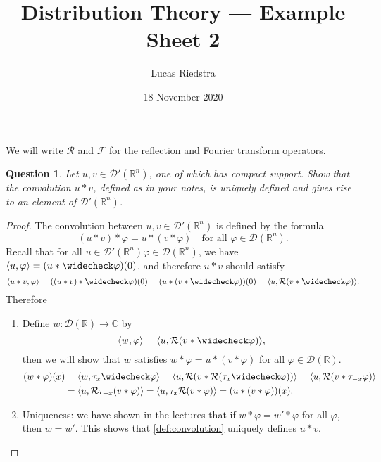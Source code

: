 \documentclass{article}
\title{Distribution Theory --- Example Sheet 2} %
\author{Lucas Riedstra}
\date{18 November 2020} %
\theoremstyle{plain}
\newtheorem{question}{Question}
\theoremstyle{remark}
\renewcommand{\phi}{\varphi}
\newcommand{\Bb}{\mathbb}
\newcommand{\Cal}{\mathcal}
\newcommand{\CC}{\Bb C}
\newcommand{\RR}{\Bb R}
\newcommand{\DD}{\Cal D}
\newcommand\FF{\Cal F}
\newcommand\Rr{\Cal R}
\DeclarePairedDelimiter{\ang}{\langle}{\rangle}
\newcommand\refl\widecheck
\begin{document}
\maketitle

\begin{mdframed}
	We will write $\Rr$ and $\FF$ for the reflection and Fourier transform operators. 
\end{mdframed}
\begin{question}
Let $u, v \in \DD'(\RR^n)$, one of which has compact support. Show that the convolution $u * v$, defined as in your notes, is uniquely defined and gives rise to an element of $\DD'(\RR^n)$. 
\end{question}

\begin{proof}
	The convolution between $u, v \in \DD'(\RR^n)$ is defined by the formula
	\begin{equation} \label{def:convolution}
	(u * v) * \phi = u * (v * \phi) \quad\text{for all $\phi \in \DD(\RR^n)$}. 
	\end{equation}
Recall that for all $u \in \DD'(\RR^n) \phi\in \DD(\RR^n)$, we have $\ang{u, \phi} = (u * \refl\phi)(0)$, and therefore $u * v$ should satisfy
\[
\ang{u * v, \phi} = ((u * v) * \refl\phi)(0) = (u * (v * \refl\phi))(0) = \ang{u, \Rr(v * \refl\phi)}. 
\] Therefore 
\begin{enumerate}
	\item Define $w \colon \DD(\RR) \to \CC$ by 
	\[
	\ang{w, \phi} = \ang{u, \Rr(v * \refl\phi)}, 
	\]
	then we will show that $w$ satisfies $w * \phi = u * (v * \phi)$ for all $\phi \in \DD(\RR)$. 
	\begin{align*}
		(w * \phi)(x) &= \ang{w, \tau_x\refl\phi} = \ang{u, \Rr(v * \Rr(\tau_x \refl\phi))} = \ang{u, \Rr(v * \tau_{-x}\phi)} \\
		&= \ang{u, \Rr \tau_{-x} (v * \phi)} = \ang{u, \tau_x \Rr(v * \phi)} = (u * (v * \phi))(x). 
	\end{align*}
\item Uniqueness: we have shown in the lectures that if $w * \phi = w' * \phi$ for all $\phi$, then $w = w'$. This shows that \cref{def:convolution} uniquely defines $u * v$. 
\end{enumerate}
	

\end{proof}
\end{document}
